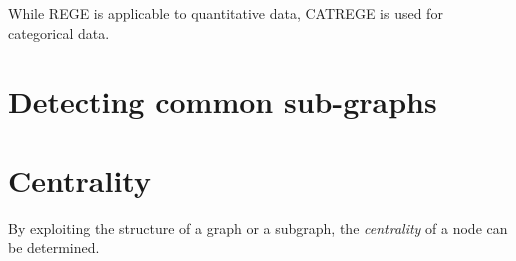 While REGE is applicable to quantitative data, CATREGE is used for categorical data. 


\section{Detecting common sub-graphs}


\begin{comment}
\section{Kernels on a Graph}

Kernels can be used on graphs to capture the similarity between two nodes or between two disjoint subgraphs. The kernel takes all paths into consideration; both indirect and direct paths. They have the property of increasing the element when the number of paths connecting two nodes are many and the length of the paths decreases. 

A kernel is a function that maps two objects to a real number to represent the similarity between the two objects. More precisely, it is a function $k(i,j):\Omega \times \Omega \rightarrow \mathbb{R}$, where the two objects $i,j\in \Omega$ are defined in some input space $\Omega$, that return a similarity measure \cite{fouss2016algorithms}. 

A simple, classical similarity measure is obtained by taking the inner product of the node vectors $x_i$ ans $x_j$. A kernel function is symmetric and positive semidefinite. 

\cite{gartner2008kernels}

\citet{kondor2002diffusionkernels} has defined the exponential diffusion kernel as
\begin{equation}
    \textbf{K} \triangleq \sum_{t=0}^{\infty} \frac{\alpha^t \textbf{A}^t}{t!} = e^{\alpha \textbf{A}}
\end{equation}
where $t$ is the number of transitions away from a specific node, $\textbf{A}$ is the adjacency matrix and the elements $a_{ij}$ represent the direct paths between nodes $i$ and $j$. $\alpha \in (0,1)$ is a discounting factor, where a small value represents small importance of nodes far away, e.g. a high number of transitions away. Thus, the kernel favors shorter paths by giving them a heavier weight.
\end{comment}

\section{Centrality}
By exploiting the structure of a graph or a subgraph, the \textit{centrality} of a node can be determined. 

